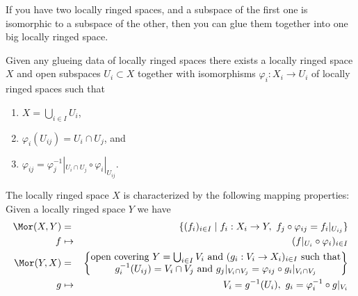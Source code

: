 \begin{lemma}
\label{lemma-glue}
\begin{slogan}
If you have two locally ringed spaces, and a subspace of the first one
is isomorphic to a subspace of the other, then you can glue them together
into one big locally ringed space.
\end{slogan}
Given any glueing data of locally ringed spaces there
exists a locally ringed space $X$ and open subspaces
$U_i \subset X$ together with isomorphisms
$\varphi_i : X_i \to U_i$ of locally ringed spaces such that
\begin{enumerate}
\item $X=\bigcup_{i\in I} U_i$,
\item $\varphi_i(U_{ij}) = U_i \cap U_j$, and
\item $\varphi_{ij} =
\varphi_j^{-1}|_{U_i \cap U_j} \circ \varphi_i|_{U_{ij}}$.
\end{enumerate}
The locally ringed space $X$ is characterized by the following
mapping properties: Given a locally ringed space $Y$ we have
\begin{eqnarray*}
\Mor(X, Y) & = & \{ (f_i)_{i\in I} \mid
f_i : X_i \to Y, \ f_j \circ \varphi_{ij} = f_i|_{U_{ij}}\} \\
f & \mapsto & (f|_{U_i} \circ \varphi_i)_{i \in I} \\
\Mor(Y, X) & = &
\left\{
\begin{matrix}
\text{open covering }Y = \bigcup\nolimits_{i \in I} V_i\text{ and }
(g_i : V_i \to X_i)_{i \in I}
\text{ such that}\\
g_i^{-1}(U_{ij}) = V_i \cap V_j
\text{ and }
g_j|_{V_i \cap V_j} = \varphi_{ij} \circ g_i|_{V_i \cap V_j}
\end{matrix}
\right\} \\
g & \mapsto &
V_i = g^{-1}(U_i), \ g_i = \varphi_i^{-1} \circ g|_{V_i}
\end{eqnarray*}
\end{lemma}

